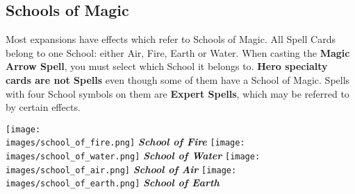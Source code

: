
\begin{multicols}{2}

\subsection*{Schools of Magic}
Most expansions have effects which refer to Schools of Magic.
All Spell Cards belong to one School: either Air, Fire, Earth or Water.
When casting the \textbf{Magic Arrow Spell}, you must select which School it belongs to.
\textbf{Hero specialty cards are not Spells} even though some of them have a School of Magic.
Spells with four School symbols on them are \textbf{Expert Spells}, which may be referred to by certain effects.

\columnbreak

\begin{minipage}[t]{0.48\textwidth}
  \centering
    \centering
    \texttt{[image: \\images/school\_of\_fire.png]}
    \textit{\textbf{\textcolor{darkcandyapplered}{School of Fire}}}
  \endminipage
    \centering
    \texttt{[image: \\images/school\_of\_water.png]}
    \textit{\textbf{\textcolor{darkcandyapplered}{School of Water}}}
  \endminipage
  \hfill\allowbreak%
  \bigbreak
    \centering
    \texttt{[image: \\images/school\_of\_air.png]}
    \textit{\textbf{\textcolor{darkcandyapplered}{School of Air}}}
  \endminipage
    \centering
    \texttt{[image: \\images/school\_of\_earth.png]}
    \textit{\textbf{\textcolor{darkcandyapplered}{School of Earth}}}
  \endminipage
  \bigbreak
\end{minipage}

\end{multicols}

